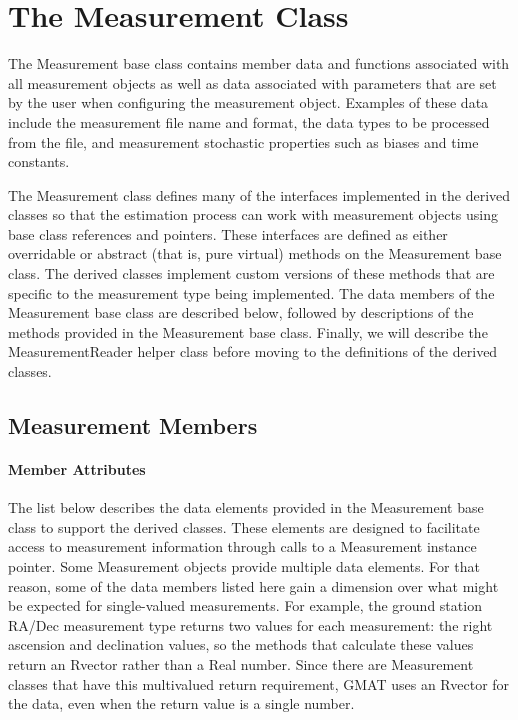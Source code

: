\section{The Measurement Class}

The Measurement base class contains member data and functions associated with all measurement objects as well as data associated with parameters that are set by the user when configuring the measurement object.  Examples of these data include the measurement file name and format, the data types to be processed from the file, and measurement stochastic properties such as biases and time constants.

The Measurement class defines many of the interfaces implemented in the derived classes so that the estimation process can work with measurement objects using base class references and pointers.  These interfaces are defined as either overridable or abstract (that is, pure virtual) methods on the Measurement base class.  The derived classes implement custom versions of these methods that are specific to the measurement type being implemented.  The data members of the Measurement base class are described below, followed by descriptions of the methods provided in the Measurement base class.  Finally, we will describe the MeasurementReader helper class before moving to the definitions of the derived classes.

\subsection{Measurement Members}

\paragraph{Member Attributes}

The list below describes the data elements provided in the Measurement base class to support the derived classes.  These elements are designed to facilitate access to measurement information through calls to a Measurement instance pointer.  Some Measurement objects provide multiple data elements.  For that reason, some of the data members listed here gain a dimension over what might be expected for single-valued measurements.  For example, the ground station RA/Dec measurement type returns two values for each measurement: the right ascension and declination values, so the methods that calculate these values return an Rvector rather than a Real number.  Since there are
Measurement classes that have this multivalued return requirement, GMAT uses an Rvector for the data, even when the return value is a single number.


